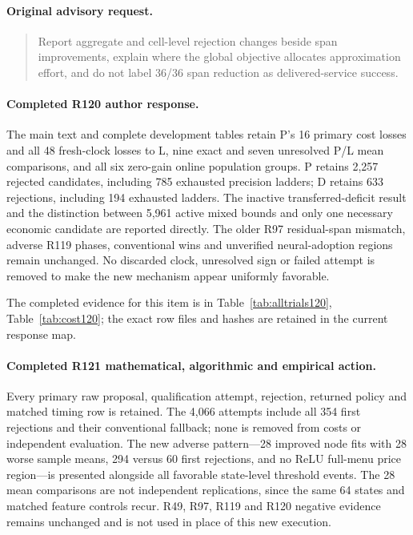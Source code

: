 \paragraph{Original advisory request.}
\begin{quote}
Report aggregate and cell-level rejection changes beside span improvements, explain where the global objective allocates approximation effort, and do not label 36/36 span reduction as delivered-service success.
\end{quote}

\paragraph{Completed R120 author response.}
The main text and complete development tables retain P's 16 primary cost losses and all 48 fresh-clock losses to L, nine exact and seven unresolved P/L mean comparisons, and all six zero-gain online population groups. P retains 2,257 rejected candidates, including 785 exhausted precision ladders; D retains 633 rejections, including 194 exhausted ladders. The inactive transferred-deficit result and the distinction between 5,961 active mixed bounds and only one necessary economic candidate are reported directly. The older R97 residual-span mismatch, adverse R119 phases, conventional wins and unverified neural-adoption regions remain unchanged. No discarded clock, unresolved sign or failed attempt is removed to make the new mechanism appear uniformly favorable.

The completed evidence for this item is in Table~\ref{tab:alltrials120}, Table~\ref{tab:cost120}; the exact row files and hashes are retained in the current response map.

\paragraph{Completed R121 mathematical, algorithmic and empirical action.}
Every primary raw proposal, qualification attempt, rejection, returned policy and matched timing row is retained. The 4,066 attempts include all 354 first rejections and their conventional fallback; none is removed from costs or independent evaluation. The new adverse pattern---28 improved node fits with 28 worse sample means, 294 versus 60 first rejections, and no ReLU full-menu price region---is presented alongside all favorable state-level threshold events. The 28 mean comparisons are not independent replications, since the same 64 states and matched feature controls recur. R49, R97, R119 and R120 negative evidence remains unchanged and is not used in place of this new execution.

